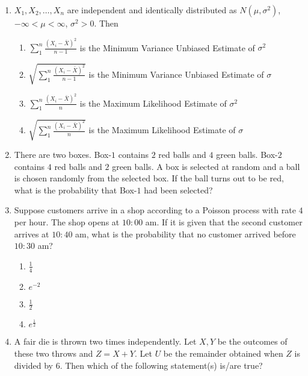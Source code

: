 \renewcommand{\theequation}{\theenumi}
\renewcommand{\thefigure}{\theenumi}
\renewcommand{\thetable}{\theenumi}
\begin{enumerate}[label=\thesection.\arabic*.,ref=\thesection.\theenumi]

\item $X_1,X_2,\ldots,X_n$ are independent and identically
distributed as $N(\mu, \sigma^2)$, $-\infty < \mu < \infty$, $\sigma^2 > 0$. Then
\begin{enumerate}
    \item $\sum_1^n\frac{(X_i-\bar{X})^2}{n-1}$ is the Minimum Variance Unbiased Estimate of $\sigma^2$\\
    \item $\sqrt{\sum_1^n\frac{(X_i-\bar{X})^2}{n-1}}$ is the Minimum Variance Unbiased Estimate of $\sigma$\\
    \item $\sum_1^n\frac{(X_i-\bar{X})^2}{n}$ is the Maximum Likelihood Estimate of $\sigma^2$\\
    \item $\sqrt{\sum_1^n\frac{(X_i-\bar{X})^2}{n}}$ is the Maximum Likelihood \qquad Estimate of $\sigma$
\end{enumerate}
%
\solution

%
\item There are two boxes. Box-$1$ contains $2$ red balls and $4$ green balls. Box-$2$ contains $4$ red balls and $2$ green balls. A box is selected at random and a ball is chosen randomly from the selected box. If the ball turns out to be red, what is the probability that Box-$1$ had been selected?
%
\solution

%
\item Suppose customers arrive in a shop according to a Poisson process with rate $4$ per hour. The shop opens at $10:00$ am. If it is given that the second customer arrives at $10:40 $ am, what is the probability that no customer arrived before $10:30 $ am? 
%
    \begin{enumerate}
        \item $\frac{1}{4}$
        \item $e^{-2}$
        \item $\frac{1}{2}$
        \item $e^{\frac{1}{2}}$
    \end{enumerate}
%
%
\solution

%
\item A fair die is thrown two times independently. Let $X,Y$ be the outcomes of these two throws and $Z=X+Y$. Let $U$ be the remainder obtained when $Z$ is divided by 6. Then which of the following statement(s) is/are true?

\end{enumerate}
